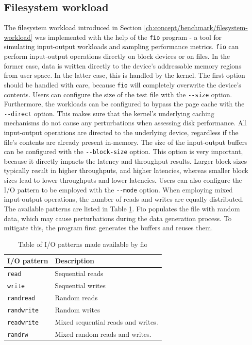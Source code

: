 \subsection{Filesystem workload}
The filesystem workload introduced in Section \ref{ch:concept/benchmark/filesystem-workload} was 
implemented with the help of the \verb|fio| program - a tool for simulating input-output workloads 
and sampling performance metrics. \verb|fio| can perform input-output operations directly on 
block devices or on files. In the former case, data is written directly to the device's
addressable memory regions from user space. In the latter case, this is handled by the kernel.
The first option should be handled with care, because \verb|fio| will completely overwrite 
the device's contents. Users can configure the size of the test file with the \verb|--size| option. 
Furthermore, the workloads can be configured to bypass the page cache with the \verb|--direct| option. 
This makes sure that the kernel's underlying caching mechanisms do not cause any perturbations when assessing 
disk performance. All input-output operations are directed to the underlying device, regardless 
if the file's contents are already present in-memory. The size of the input-output buffers can be 
configured with the \verb|--block-size| option. This option is very important, because it directly 
impacts the latency and throughput results. Larger block sizes typically result in higher 
throughputs, and higher latencies, whereas smaller block sizes lead to lower throughputs and 
lower latencies. Users can also configure the I/O pattern to be employed with the \verb|--mode|
option. When employing mixed input-output operations, the number of reads and writes are equally 
distributed. The available patterns are listed in Table \ref{table:implementation/benchmark/filesystem-workload/io-patterns}.
Fio populates the file with random data, which may cause perturbations during the 
data generation process.
To mitigate this, the program first generates the buffers and reuses 
them.  
\begin{table}[h!]
    \centering
    \begin{tabular}{ |m{4cm}|m{20em}| }
        \hline
        I/O pattern & Description \\
        \hline
        \verb|read| & Sequential reads \\
        \hline 
        \verb|write| & Sequential writes \\
        \hline
        \verb|randread| & Random reads \\
        \hline
        \verb|randwrite| & Random writes\\
        \hline
        \verb|readwrite| & Mixed sequential reads and writes. \\
        \hline
        \verb|randrw| & Mixed random reads and writes. \\
        \hline
    \end{tabular}
    \caption{Table of I/O patterns made available by fio}
    \label{table:implementation/benchmark/filesystem-workload/io-patterns}
\end{table} 
